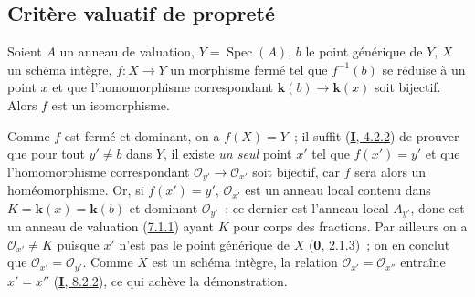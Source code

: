 \subsection{Critère valuatif de propreté}
\label{subsection:II.7.3-fr}

\begin{proposition}[7.3.1]
\label{II.7.3.1-fr}
Soient $A$ un anneau de valuation, $Y=\operatorname{Spec}(A)$, $b$ le point
générique de $Y$, $X$ un \textup{schéma} intègre, $f:X\to Y$ un morphisme \textup{fermé} tel
que $f^{-1}(b)$ se réduise à un point $x$ et que l'homomorphisme correspondant
$\boldsymbol{k}(b)\to \boldsymbol{k}(x)$ soit bijectif. Alors $f$ est un isomorphisme.
\end{proposition}

Comme $f$ est fermé et dominant, on a $f(X)=Y$~; il suffit
(\hyperref[I.4.2.2-fr]{\textbf{I}, 4.2.2}) de prouver que pour tout $y'\neq b$ dans $Y$,
il existe \emph{un seul} point $x'$ tel que $f(x')=y'$ et que l'homomorphisme
correspondant $\mathcal{O}_{y'}\to\mathcal{O}_{x'}$ soit bijectif, car $f$ sera
alors un homéomorphisme. Or, si $f(x')=y'$, $\mathcal{O}_{x'}$ est un anneau
local contenu dans $K=\boldsymbol{k}(x)=\boldsymbol{k}(b)$ et dominant $\mathcal{O}_{y'}$~; ce dernier
est l'anneau local $A_{y'}$, donc est un anneau de valuation
(\hyperref[II.7.1.1-fr]{7.1.1}) ayant $K$ pour corps des fractions. Par
ailleurs on a $\mathcal{O}_{x'}\neq K$ puisque $x'$ n'est pas le point
générique de $X$ (\hyperref[0.2.1.3-fr]{\textbf{0}, 2.1.3})~; on en conclut que
$\mathcal{O}_{x'}=\mathcal{O}_{y'}$. Comme $X$ est un schéma intègre, la
relation $\mathcal{O}_{x'}=\mathcal{O}_{x''}$ entraîne $x'=x''$
(\hyperref[I.8.2.2-fr]{\textbf{I}, 8.2.2}), ce qui achève la démonstration.

